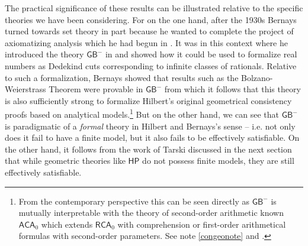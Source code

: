 \documentclass[11pt,fleqn,leqno]{article}
\begin{document}
The practical significance of these results can be illustrated relative to the specific theories we have been considering.  For on the one hand, after the 1930s Bernays turned towards set theory in part because he wanted to complete the project of axiomatizing analysis which he had begun in \citeyearpar[Sup. IV]{Hilbert1939}.   It was in this context where he introduced the theory $\mathsf{GB}^-$ in \citeyearpar{Bernays1942} and showed how it could be used to formalize real numbers as Dedekind cuts corresponding to infinite classes of rationals.  Relative to such a formalization, Bernays showed that results such as the Bolzano-Weierstrass Theorem were provable in $\mathsf{GB}^-$ from which it follows that this theory is also sufficiently strong to formalize Hilbert's original geometrical consistency proofs based on analytical models.\footnote{From the contemporary perspective this can be seen directly as $\mathsf{GB}^-$ is mutually interpretable with the theory of second-order arithmetic known $\mathsf{ACA}_0$ which extends $\mathsf{RCA}_0$ with comprehension or first-order arithmetical formulas with second-order parameters.   See note \ref{congeonote} and \citep[\S 2]{Dean2017b}.}  But on the other hand, we can see that $\mathsf{GB}^-$  is paradigmatic of a \textsl{formal} theory in Hilbert and Bernays's sense -- i.e. not only does it fail to have a finite model, but it also fails to be effectively satisfiable.  On the other hand, it follows from the work of Tarski discussed in the next section that while geometric theories like $\mathsf{HP}$ do not possess finite models, they are still effectively satisfiable.
\end{document}
